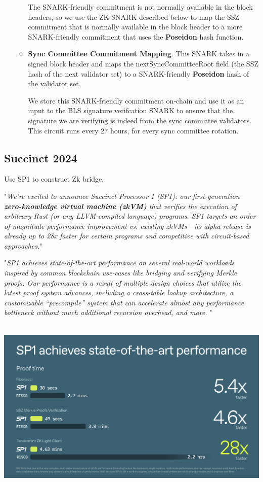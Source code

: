 \documentclass{article}
\begin{document}
\begin{itemize}
\begin{itemize}
        The SNARK-friendly commitment is not normally available in the block headers, so we use the ZK-SNARK described below to map the SSZ commitment that is normally available in the block header to a more SNARK-friendly commitment that uses the \textbf{Poseidon} hash function.

        \item \textbf{Sync Committee Commitment Mapping}. This SNARK takes in a signed block header and maps the nextSyncCommitteeRoot field (the SSZ hash of the next validator set) to a SNARK-friendly \textbf{Poseidon} hash of the validator set. 

        We store this SNARK-friendly commitment on-chain and use it as an input to the BLS signature verifcation SNARK to ensure that the signature we are verifying is indeed from the sync committee validators. This circuit runs every 27 hours, for every sync committee rotation.
    \end{itemize}
\end{itemize}


\subsection{Succinct 2024}

Use SP1 to construct Zk bridge.

"\textit{We’re excited to announce Succinct Processor 1 (SP1): our first-generation \textbf{zero-knowledge virtual machine (zkVM)} that verifies the execution of arbitrary Rust (or any LLVM-compiled language) programs. SP1 targets an order of magnitude performance improvement vs. existing zkVMs—its alpha release is already up to 28x faster for certain programs and competitive with circuit-based approaches.}"


"\textit{SP1 achieves state-of-the-art performance on several real-world workloads inspired by common blockchain use-cases like bridging and verifying Merkle proofs. Our performance is a result of multiple design choices that utilize the latest proof system advances, including a cross-table lookup architecture, a customizable “precompile” system that can accelerate almost any performance bottleneck without much additional recursion overhead, and more. }"

~\\

\includegraphics[width=1\linewidth]{SP1.png}
\end{document}
